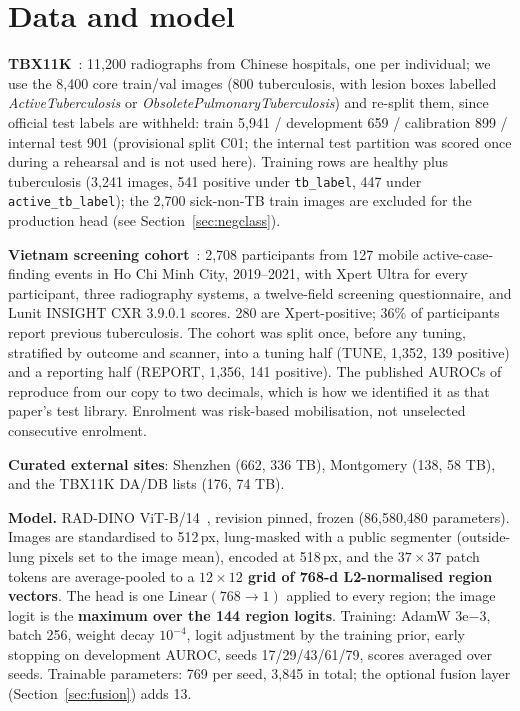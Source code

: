 \documentclass[11pt,a4paper]{article}
\newcommand{\code}[1]{\texttt{#1}}
\begin{document}
\section{Data and model}\label{sec:data}
\textbf{TBX11K}~\cite{liu2024tbx11k}: 11,200 radiographs from Chinese hospitals, one per individual; we use the 8,400 core train/val images (800 tuberculosis, with lesion boxes labelled \emph{ActiveTuberculosis} or \emph{ObsoletePulmonaryTuberculosis}) and re-split them, since official test labels are withheld: train 5,941 / development 659 / calibration 899 / internal test 901 (provisional split C01; the internal test partition was scored once during a rehearsal and is not used here). Training rows are healthy plus tuberculosis (3,241 images, 541 positive under \code{tb\_label}, 447 under \code{active\_tb\_label}); the 2,700 sick-non-TB train images are excluded for the production head (see Section~\ref{sec:negclass}).

\textbf{Vietnam screening cohort}~\cite{codlin2025}: 2,708 participants from 127 mobile active-case-finding events in Ho Chi Minh City, 2019--2021, with Xpert Ultra for every participant, three radiography systems, a twelve-field screening questionnaire, and Lunit INSIGHT CXR 3.9.0.1 scores. 280 are Xpert-positive; 36\% of participants report previous tuberculosis. The cohort was split once, before any tuning, stratified by outcome and scanner, into a tuning half (TUNE, 1,352, 139 positive) and a reporting half (REPORT, 1,356, 141 positive). The published AUROCs of~\cite{codlin2025} reproduce from our copy to two decimals, which is how we identified it as that paper's test library. Enrolment was risk-based mobilisation, not unselected consecutive enrolment.

\textbf{Curated external sites}: Shenzhen (662, 336 TB), Montgomery (138, 58 TB), and the TBX11K DA/DB lists (176, 74 TB).

\textbf{Model.} RAD-DINO ViT-B/14~\cite{perezgarcia2025raddino}, revision pinned, frozen (86,580,480 parameters). Images are standardised to 512\,px, lung-masked with a public segmenter (outside-lung pixels set to the image mean), encoded at 518\,px, and the $37\times37$ patch tokens are average-pooled to a \textbf{$12\times12$ grid of 768-d L2-normalised region vectors}. The head is one $\mathrm{Linear}(768\to1)$ applied to every region; the image logit is the \textbf{maximum over the 144 region logits}. Training: AdamW $3\mathrm{e}{-3}$, batch 256, weight decay $10^{-4}$, logit adjustment by the training prior, early stopping on development AUROC, seeds 17/29/43/61/79, scores averaged over seeds. Trainable parameters: 769 per seed, 3,845 in total; the optional fusion layer (Section~\ref{sec:fusion}) adds 13.
\end{document}
